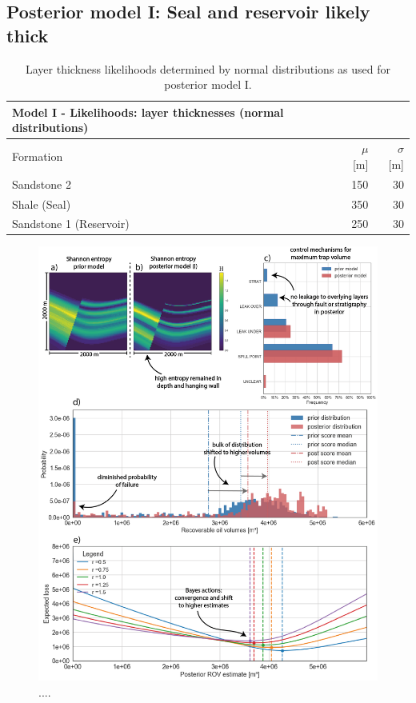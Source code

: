 		\subsection{Posterior model I: Seal and reservoir likely thick}
		\begin{table}[h]
			\centering
			\begin{tabular}{lrr} 
				\toprule
				Model I - Likelihoods: layer thicknesses (normal distributions)\\  
				\midrule 
				Formation & $\mu$ [m] & $\sigma$ [m]\\ 
				\midrule 
				Sandstone 2 & 150 & 30 \\
				Shale (Seal) & 350 & 30\\ 
				Sandstone 1 (Reservoir) & 250 & 30 \\
				\bottomrule
			\end{tabular}
			\caption{Layer thickness likelihoods determined by normal distributions as used for posterior model I.}
			\label{tab:ML1_likelihoods}
		\end{table}
		\begin{figure}[p!]
			\centering
			\includegraphics[width=1\textwidth]{Figures/ML1}
			\caption{....}\label{fig:ML1}
		\end{figure}		
